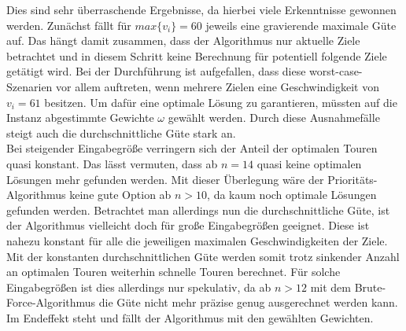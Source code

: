 \documentclass[german,version-2019-11]{uzl-thesis}
\begin{document}
\begin{table}[htpb]
\centering
{}
\caption{Güte des Prioritäts-Algorithmus}
\label{tab:ExpGüte}
\end{table}
\noindent
Dies sind sehr überraschende Ergebnisse, da hierbei viele Erkenntnisse gewonnen werden. Zunächst fällt für $max\{v_i\}=60$ jeweils eine gravierende maximale Güte auf. Das hängt damit zusammen, dass der Algorithmus nur aktuelle Ziele betrachtet und in diesem Schritt keine Berechnung für potentiell folgende Ziele getätigt wird. Bei der Durchführung ist aufgefallen, dass diese worst-case-Szenarien vor allem auftreten, wenn mehrere Zielen eine Geschwindigkeit von $v_i=61$ besitzen. Um dafür eine optimale Lösung zu garantieren, müssten auf die Instanz abgestimmte Gewichte $\omega$ gewählt werden. Durch diese Ausnahmefälle steigt auch die durchschnittliche Güte stark an. \\
Bei steigender Eingabegröße verringern sich der Anteil der optimalen Touren quasi konstant. Das lässt vermuten, dass ab $n=14$ quasi keine optimalen Lösungen mehr gefunden werden. Mit dieser Überlegung wäre der Prioritäts-Algorithmus keine gute Option ab $n>10$, da kaum noch optimale Lösungen gefunden werden. Betrachtet man allerdings nun die durchschnittliche Güte, ist der Algorithmus vielleicht doch für große Eingabegrößen geeignet. Diese ist nahezu konstant für alle die jeweiligen maximalen Geschwindigkeiten der Ziele. Mit der konstanten durchschnittlichen Güte werden somit trotz sinkender Anzahl an optimalen Touren weiterhin schnelle Touren berechnet. Für solche Eingabegrößen ist dies allerdings nur spekulativ, da ab $n>12$ mit dem Brute-Force-Algorithmus die Güte nicht mehr präzise genug ausgerechnet werden kann. Im Endeffekt steht und fällt der Algorithmus mit den gewählten Gewichten.
\end{document}

